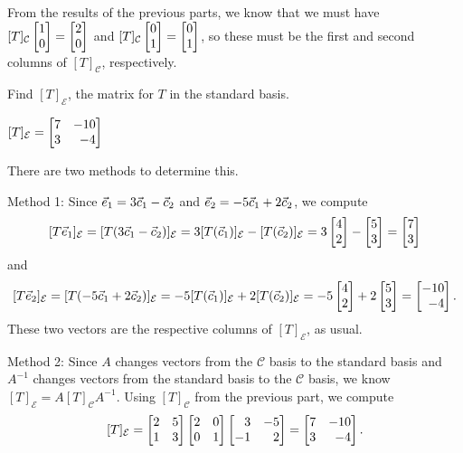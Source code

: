 \documentclass{problemset}
\begin{document}
\begin{parts}[resume]
\begin{solution}
				From the results of the previous parts, we know that we must have
				$[T]_{\mathcal C}\mat{1\\0}=\mat{2\\0}$ and
				$[T]_{\mathcal C}\mat{0\\1}=\mat{0\\1}$, so these
				must be the first and second columns of $[T]_{\mathcal C}$, respectively.
			\end{solution}
		\item Find $[T]_{\mathcal E}$, the matrix for $T$ in the standard basis.
			\begin{solution}
				$[T]_{\mathcal E}=\mat{7&-10\\3&-4}$

				There are two methods to determine this.

				Method 1:
				Since ${\vec e_1}=3\vec c_1-\vec c_2$ and ${\vec e_2}=-5\vec c_1+2\vec c_2$,
				we compute
				\[
					[T\xhat]_{\mathcal E}
					=[T(3\vec c_1-\vec c_2)]_{\mathcal E}
					=3[T(\vec c_1)]_{\mathcal E}-[T(\vec c_2)]_{\mathcal E}
					=3\mat{4\\2}-\mat{5\\3}
					=\mat{7\\3}
				\]
				and
				\[
					[T\yhat]_{\mathcal E}
					=[T(-5\vec c_1+2\vec c_2)]_{\mathcal E}
					=-5[T(\vec c_1)]_{\mathcal E}+2[T(\vec c_2)]_{\mathcal E}
					=-5\mat{4\\2}+2\mat{5\\3}
					=\mat{-10\\-4}.
				\]
				These two vectors are the respective columns of $[T]_{\mathcal E}$,
				as usual.

				Method 2:
				Since $A$ changes vectors from the $\mathcal C$ basis to the standard
				basis and $A^{-1}$ changes vectors from the standard basis to the
				$\mathcal C$ basis, we know $[T]_{\mathcal E} = A[T]_{\mathcal C}A^{-1}$.
				Using $[T]_{\mathcal C}$ from the previous part, we compute
				\[
					[T]_{\mathcal E}
					=\mat{2&5\\1&3}\mat{2&0\\0&1}\mat{3&-5\\-1&2}
					=\mat{7&-10\\3&-4}.
				\]


			\end{solution}
	\end{parts}

\end{document}
